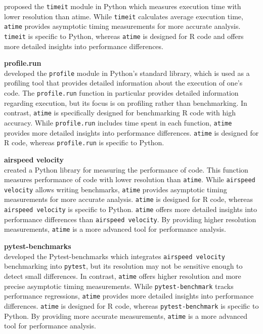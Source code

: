 \citet{timeit} proposed the \texttt{timeit} module in Python which measures execution time with lower resolution than atime. While \texttt{timeit} calculates average execution time, \texttt{atime} provides asymptotic timing measurements for more accurate analysis. \texttt{timeit} is specific to Python, whereas \texttt{atime} is designed for R code and offers more detailed insights into performance differences.
\vspace{0.1in}

\textbf{profile.run} \\
\citet{profile} developed the \texttt{profile} module in Python's standard library, which is used as a profiling tool that provides detailed information about the execution of one's code. The \texttt{profile.run} function in particular provides detailed information regarding execution, but its focus is on profiling rather than benchmarking. In contrast, \texttt{atime} is specifically designed for benchmarking R code with high accuracy. While \texttt{profile.run} includes time spent in each function, \texttt{atime} provides more detailed insights into performance differences. \texttt{atime} is designed for R code, whereas \texttt{profile.run} is specific to Python.
\vspace{0.1in}

\textbf{airspeed velocity} \\
\citet{airspeed_velocity} created a Python library for measuring the performance of code. This function measures performance of code with lower resolution than \texttt{atime}. While \texttt{airspeed velocity} allows writing benchmarks, \texttt{atime} provides asymptotic timing measurements for more accurate analysis. \texttt{atime} is designed for R code, whereas \texttt{airspeed velocity} is specific to Python. \texttt{atime} offers more detailed insights into performance differences than \texttt{airspeed velocity}. By providing higher resolution measurements, \texttt{atime} is a more advanced tool for performance analysis.
\vspace{0.1in}

\textbf{pytest-benchmarks} \\
\citet{pytest_benchmark} developed the Pytest-benchmarks which integrates \texttt{airspeed velocity} benchmarking into \texttt{pytest}, but its resolution may not be sensitive enough to detect small differences. In contrast, \texttt{atime} offers higher resolution and more precise asymptotic timing measurements. While \texttt{pytest-benchmark} tracks performance regressions, \texttt{atime} provides more detailed insights into performance differences. \texttt{atime} is designed for R code, whereas \texttt{pytest-benchmark} is specific to Python. By providing more accurate measurements, \texttt{atime} is a more advanced tool for performance analysis.
\vspace{0.1in}

